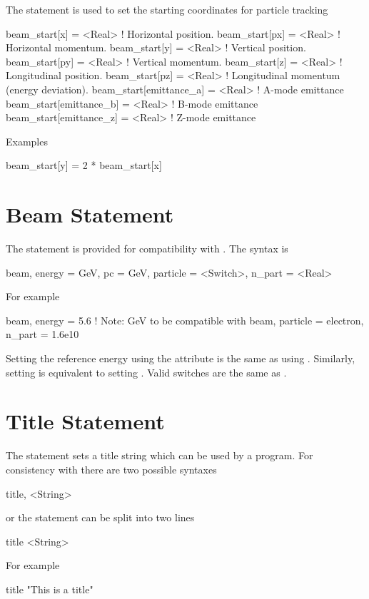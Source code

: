 The  statement is used to set the starting coordinates
for particle tracking
\begin{example}
  beam_start[x]    = <Real> ! Horizontal position.
  beam_start[px]   = <Real> ! Horizontal momentum.
  beam_start[y]    = <Real> ! Vertical position.
  beam_start[py]   = <Real> ! Vertical momentum.
  beam_start[z]    = <Real> ! Longitudinal position.
  beam_start[pz]   = <Real> ! Longitudinal momentum (energy deviation).
  beam_start[emittance_a] = <Real> ! A-mode emittance
  beam_start[emittance_b] = <Real> ! B-mode emittance
  beam_start[emittance_z] = <Real> ! Z-mode emittance
\end{example}

\noindent
Examples
\begin{example}
  beam_start[y] = 2 * beam_start[x]
\end{example}

\section{Beam Statement}

The  statement is provided for compatibility with \mad. The syntax is
\begin{example}
  beam, energy = GeV, pc = GeV, particle = <Switch>, n_part = <Real>
\end{example}
For example
\begin{example}
  beam, energy = 5.6  ! Note: GeV to be compatible with \mad
  beam, particle = electron, n_part = 1.6e10
\end{example}
Setting the reference energy using the  attribute is the
same as using . Similarly, setting  is
equivalent to setting . Valid  switches
are the same as .

\section{Title Statement}

The  statement sets a title string which can be used by a program. 
For consistency with \mad there are two possible syntaxes
\begin{example}
  title, <String>
\end{example}
or the statement can be split into two lines
\begin{example}
  title
  <String>
\end{example}
For example
\begin{example}
  title
  "This is a title"
\end{example}

